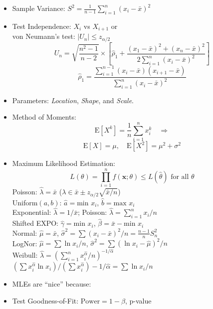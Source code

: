 \documentclass[10pt, twocolumn]{article}
\begin{document}
\begin{itemize}
\item Sample Variance: $S^2=\frac{1}{n-1}\sum_{i=1}^n(x_i-\bar{x})^2$
\item Test Independence: $X_i$ vs $X_{i+1}$ or \\ 
von Neumann's test: $|U_n| \leq z_{\alpha/2}$
\[ U_n = \sqrt{\frac{n^2-1}{n-2}} \times \left[\hat{\rho}_1+\frac{(x_1-\bar{x})^2+(x_n-\bar{x})^2}{2\sum_{i=1}^n(x_i-\bar{x})^2}\right] \]
\[ \hat{\rho}_1 = \frac{\sum_{i=1}^{n-1}(x_i-\bar{x})(x_{i+1}-\bar{x})}{\sum_{i=1}^n(x_i-\bar{x})^2} \]
\item Parameters: \emph{Location}, \emph{Shape}, and \emph{Scale}.
\item Method of Moments: 
\[ \text{E}[X^k] = \frac{1}{n}\sum_{i=1}^n x_i^k \quad\Rightarrow \]
\[ \text{E}[X] = \mu, \quad\text{E}[X^2] = \mu^2 + \sigma^2 \]
\item Maximum Likelihood Estimation: 
\[ L(\theta) = \prod_{i=1}^nf(\boldsymbol{x};\theta) \leq L(\hat{\theta}) \text{ for all } \theta \]
Poisson: $\hat{\lambda}=\bar{x}$ ($\lambda \in \bar{x} \pm z_{\alpha/2}\sqrt{\bar{x}/n}$) \\
Uniform$(a,b)$: $\hat{a}=\text{min }x_i$, $\hat{b}=\text{max }x_i$ \\
Exponential: $\hat{\lambda}=1/\bar{x}$; Poisson: $\hat{\lambda}=\sum_{i=1}^nx_i/n$ \\
Shifted EXPO: $\hat{\gamma}=\text{min }x_i$, $\hat{\beta}=\bar{x}-\text{min }x_i$ \\
Normal: $\hat{\mu}=\bar{x}$, $\hat{\sigma}^2=\sum(x_i-\bar{x})^2/n=\frac{n-1}{n}S_n^2$ \\
LogNor: $\hat{\mu}=\sum\ln x_i/n$, $\hat{\sigma}^2=\sum(\ln x_i-\hat{\mu})^2/n$ \\
Weibull: $\hat{\lambda}=\left(\sum_{i=1}^nx_i^{\hat{\alpha}}/n\right)^{-1/\hat{\alpha}}$ \\
$(\sum x_i^{\hat{\alpha}}\ln x_i)/(\sum x_i^{\hat{\alpha}})-1/\hat{\alpha}=\sum\ln x_i/n$
\item MLEs are ``nice'' because: 
\item Test Goodness-of-Fit: $\text{Power}=1-\beta$, p-value \\

\end{itemize}
\end{document}
